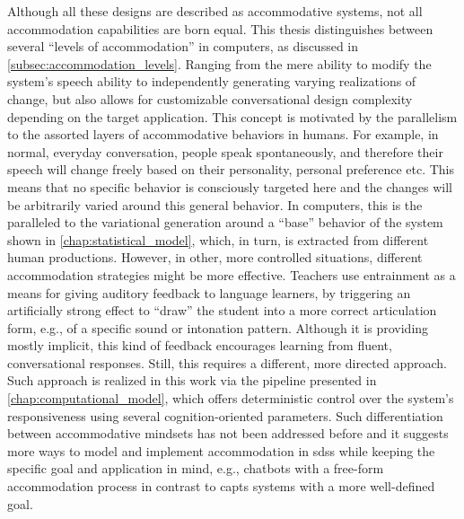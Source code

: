 Although all these designs are described as accommodative systems, not all accommodation capabilities are born equal.
This thesis distinguishes between several \enquote{levels of accommodation} in computers, as discussed in \cref{subsec:accommodation_levels}.
Ranging from the mere ability to modify the system's speech ability to independently generating varying realizations of change, but also allows for customizable conversational design complexity depending on the target application.
This concept is motivated by the parallelism to the assorted layers of accommodative behaviors in humans.
For example, in normal, everyday conversation, people speak spontaneously, and therefore their speech will change freely based on their personality, personal preference etc.
This means that no specific behavior is consciously targeted here and the changes will be arbitrarily varied around this general behavior.
In computers, this is the paralleled to the variational generation around a \enquote{base} behavior of the system shown in \cref{chap:statistical_model}, which, in turn, is extracted from different human productions.
However, in other, more controlled situations, different accommodation strategies might be more effective.
Teachers use entrainment as a means for giving auditory feedback to language learners, by triggering an artificially strong effect to \enquote{draw} the student into a more correct articulation form, e.g., of a specific sound or intonation pattern.
Although it is providing mostly implicit, this kind of feedback encourages learning from fluent, conversational responses.
Still, this requires a different, more directed approach.
Such approach is realized in this work via the pipeline presented in \cref{chap:computational_model}, which offers deterministic control over the system's responsiveness using several cognition-oriented parameters.
Such differentiation between accommodative mindsets has not been addressed before and it suggests more ways to model and implement accommodation in \acp{sds} while keeping the specific goal and application in mind, e.g., chatbots with a free-form accommodation process in contrast to \acp{capt} systems with a more well-defined goal.
















